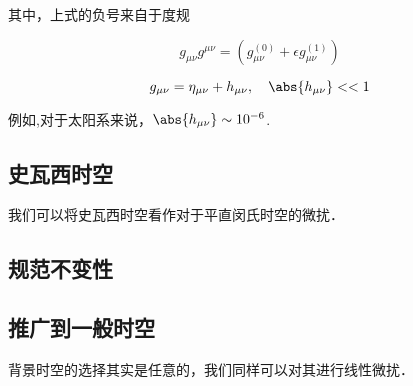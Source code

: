 其中，上式的负号来自于度规

\begin{equation}
g_{\mu\nu}g^{\mu\nu} = (g^{(0)}_{\mu\nu} + \epsilon g^{(1)}_{\mu\nu})
\end{equation}

\begin{equation}
g_{\mu\nu} = \eta_{\mu\nu} + h_{\mu\nu},\quad \abs{h_{\mu\nu}}<<1
\end{equation}

例如,对于太阳系来说，$\abs{h_{\mu\nu}} \sim 10^{-6}$.




\subsection{史瓦西时空}

我们可以将史瓦西时空看作对于平直闵氏时空的微扰．


\subsection{规范不变性}


\subsection{推广到一般时空}

背景时空的选择其实是任意的，我们同样可以对其进行线性微扰．

